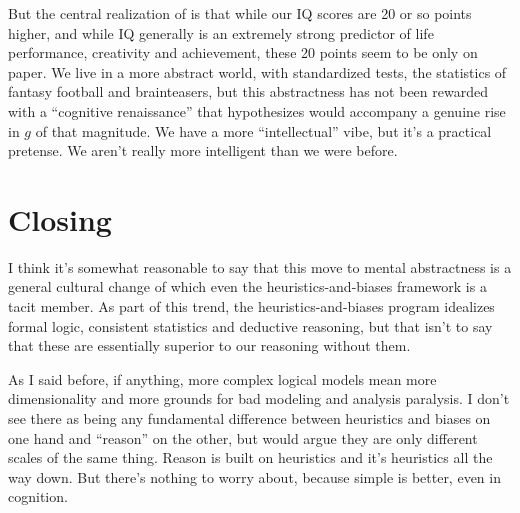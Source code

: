 \documentclass{article}
\begin{document}
But the central realization of \textcite{flynn87} is that while our IQ scores are 20 or so points higher, and while IQ generally is an extremely strong predictor of life performance, creativity and achievement, these 20 points seem to be only on paper.
We live in a more abstract world, with standardized tests, the statistics of fantasy football and brainteasers, but this abstractness has not been rewarded with a ``cognitive renaissance'' that \textcite{flynn07} hypothesizes would accompany a genuine rise in $g$ of that magnitude.
We have a more ``intellectual'' vibe, but it's a practical pretense.
We aren't really more intelligent than we were before.

\section{Closing}

I think it's somewhat reasonable to say that this move to mental abstractness is a general cultural change of which even the heuristics-and-biases framework is a tacit member.
As part of this trend, the heuristics-and-biases program idealizes formal logic, consistent statistics and deductive reasoning, but that isn't to say that these are essentially superior to our reasoning without them.

As I said before, if anything, more complex logical models mean more dimensionality and more grounds for bad modeling and analysis paralysis.
I don't see there as being any fundamental difference between heuristics and biases on one hand and ``reason'' on the other, but would argue they are only different scales of the same thing.
Reason is built on heuristics and it's heuristics all the way down.
But there's nothing to worry about, because simple is better, even in cognition.


\printbibliography
\end{document}
